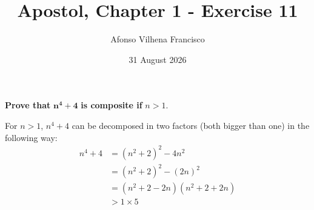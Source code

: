 \documentclass{article}
\title{Apostol, Chapter 1 - Exercise 11}
\author{Afonso Vilhena Francisco}
\date{31 August 2026}
\begin{document}
\maketitle

\textbf{Prove that} $\mathbf{n^4+4}$ \textbf{is composite if} $n>1.$

\vspace{0.5cm}
For $n>1$, $n^4+4$ can be decomposed in two factors (both bigger than one) in the following way:
\begin{align*}
    n^4+4 &= (n^2+2)^2-4n^2\\
          &= (n^2+2)^2-(2n)^2\\
          &= (n^2+2-2n)(n^2+2+2n)\\
          &>1\times 5
\end{align*}
\end{document}
